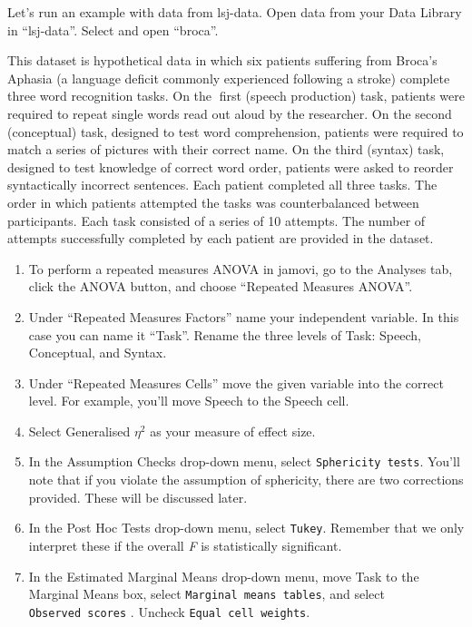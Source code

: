 \documentclass[
]{book}
\begin{document}
Let's run an example with data from lsj-data. Open data from your Data Library in ``lsj-data''. Select and open ``broca''.

This dataset is hypothetical data in which six patients suffering from Broca's Aphasia (a language deficit commonly experienced following a stroke) complete three word recognition tasks. On the first (speech production) task, patients were required to repeat single words read out aloud by the researcher. On the second (conceptual) task, designed to test word comprehension, patients were required to match a series of pictures with their correct name. On the third (syntax) task, designed to test knowledge of correct word order, patients were asked to reorder syntactically incorrect sentences. Each patient completed all three tasks. The order in which patients attempted the tasks was counterbalanced between participants. Each task consisted of a series of 10 attempts. The number of attempts successfully completed by each patient are provided in the dataset.

\begin{enumerate}
\def\labelenumi{\arabic{enumi}.}
\item
  To perform a repeated measures ANOVA in jamovi, go to the Analyses tab, click the ANOVA button, and choose ``Repeated Measures ANOVA''.
\item
  Under ``Repeated Measures Factors'' name your independent variable. In this case you can name it ``Task''. Rename the three levels of Task: Speech, Conceptual, and Syntax.
\item
  Under ``Repeated Measures Cells'' move the given variable into the correct level. For example, you'll move Speech to the Speech cell.
\item
  Select Generalised \(\eta^2\) as your measure of effect size.
\item
  In the Assumption Checks drop-down menu, select \texttt{Sphericity\ tests}. You'll note that if you violate the assumption of sphericity, there are two corrections provided. These will be discussed later.
\item
  In the Post Hoc Tests drop-down menu, select \texttt{Tukey}. Remember that we only interpret these if the overall \emph{F} is statistically significant.
\item
  In the Estimated Marginal Means drop-down menu, move Task to the Marginal Means box, select \texttt{Marginal\ means\ tables}, and select \texttt{Observed\ scores} . Uncheck \texttt{Equal\ cell\ weights}.
\end{enumerate}
\end{document}

